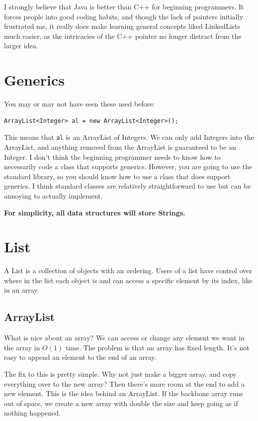 \documentclass[11pt]{book}
\begin{document}
I strongly believe that Java is better than C++ for beginning programmers. It forces people into good coding habits, and though the lack of pointers initially frustrated me, it really does make learning general concepts liked LinkedLists much easier, as the intricacies of the C++ pointer no longer distract from the larger idea.

\section{Generics}

You may or may not have seen these used before:
\begin{verbatim}
ArrayList<Integer> al = new ArrayList<Integer>();
\end{verbatim}
This means that \texttt{al} is an ArrayList of Integers. We can only add Integers into the ArrayList, and anything removed from the ArrayList is guaranteed to be an Integer. I don't think the beginning programmer needs to know how to necessarily code a class that supports generics. However, you are going to use the standard library, so you should know how to use a class that does support generics. I think standard classes are relatively straightforward to use but can be annoying to actually implement.

\textbf{For simplicity, all data structures will store Strings.}

\section{List}

A List is a collection of objects with an ordering. Users of a list have control over where in the list each object is and can access a specific element by its index, like in an array.

\subsection{ArrayList}

What is nice about an array? We can access or change any element we want in the array in $O(1)$ time. The problem is that an array has fixed length. It's not easy to append an element to the end of an array.

The fix to this is pretty simple. Why not just make a bigger array, and copy everything over to the new array? Then there's more room at the end to add a new element. This is the idea behind an ArrayList. If the backbone array runs out of space, we create a new array with double the size and keep going as if nothing happened.
\end{document}
